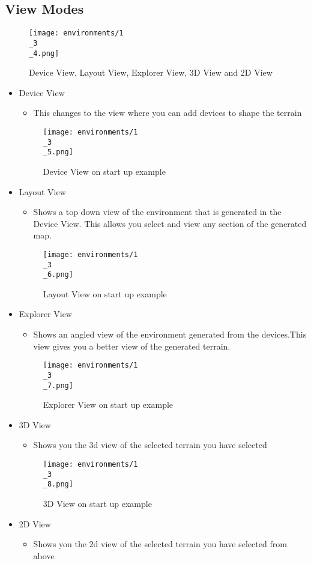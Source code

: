 \documentclass[../main.tex]{subfiles}
\begin{document}
\subsection{View Modes}
\begin{figure}[H]
\texttt{[image: environments/1\\\_3\\\_4.png]}
\caption{Device View, Layout View, Explorer View, 3D View and 2D View}
\end{figure}
\begin{itemize}
    \item Device View
    \begin{itemize}
        \item This changes to the view where you can add devices to shape the terrain
    \end{itemize}
    \begin{figure}[H]
    \texttt{[image: environments/1\\\_3\\\_5.png]}
    \caption{Device View on start up example}
    \end{figure}
    \item Layout View
    \begin{itemize}
        \item Shows a top down view of the environment that is generated in the Device View. This allows you select and view any section of the generated map.
    \end{itemize}
    \begin{figure}[H]
    \texttt{[image: environments/1\\\_3\\\_6.png]}
    \caption{Layout View on start up example}
    \end{figure}
    \item Explorer View
    \begin{itemize}
        \item Shows an angled view of the environment generated from the devices.This view gives you a better view of the generated terrain.
    \end{itemize}
    \begin{figure}[H]
    \texttt{[image: environments/1\\\_3\\\_7.png]}
    \caption{Explorer View on start up example}
    \end{figure}
    \item 3D View
    \begin{itemize}
        \item Shows you the 3d view of the selected terrain you have selected
    \end{itemize}
    \begin{figure}[H]
    \texttt{[image: environments/1\\\_3\\\_8.png]}
    \caption{3D View on start up example}
    \end{figure}
    \item 2D View
    \begin{itemize}
        \item Shows you the 2d view of the selected terrain you have selected from above
    \end{itemize}
\end{itemize}
\end{document}
